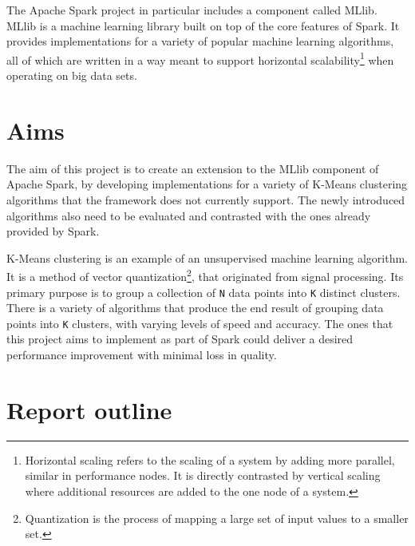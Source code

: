 \documentclass{l4proj}
\begin{document}
The Apache Spark project in particular includes a component called MLlib. MLlib is a machine learning library built on top of the core features of Spark. It provides implementations for a variety of popular machine learning algorithms, all of which are written in a way meant to support horizontal scalability\footnote{Horizontal scaling refers to the scaling of a system by adding more parallel, similar in performance nodes. It is directly contrasted by vertical scaling where additional resources are added to the one node of a system.} when operating on big data sets.

\section{Aims}

The aim of this project is to create an extension to the MLlib component of Apache Spark, by developing implementations for a variety of K-Means clustering algorithms that the framework does not currently support. The newly introduced algorithms also need to be evaluated and contrasted with the ones already provided by Spark.

K-Means clustering is an example of an unsupervised machine learning algorithm. It is a method of vector quantization\footnote{Quantization is the process of mapping a large set of input values to a smaller set.}, that originated from signal processing. Its primary purpose is to group a collection of \texttt{N} data points into \texttt{K} distinct clusters. There is a variety of algorithms that produce the end result of grouping data points into \texttt{K} clusters, with varying levels of speed and accuracy. The ones that this project aims to implement as part of Spark could deliver a desired performance improvement with minimal loss in quality.

\section{Report outline}
\end{document}
